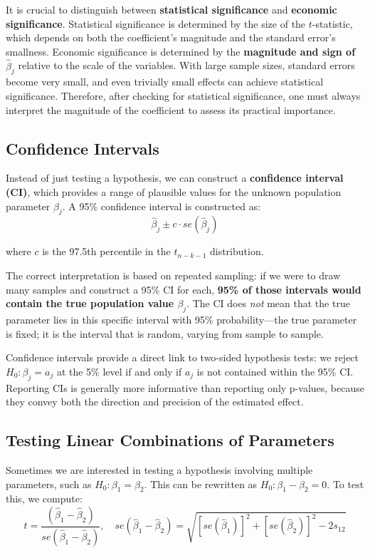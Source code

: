 It is crucial to distinguish between \textbf{statistical significance} and \textbf{economic significance}. Statistical significance is determined by the size of the $t$-statistic, which depends on both the coefficient's magnitude and the standard error's smallness. Economic significance is determined by the \textbf{magnitude and sign of $\hat{\beta}_j$} relative to the scale of the variables. With large sample sizes, standard errors become very small, and even trivially small effects can achieve statistical significance. Therefore, after checking for statistical significance, one must always interpret the magnitude of the coefficient to assess its practical importance.
\subsection{Confidence Intervals}

Instead of just testing a hypothesis, we can construct a \textbf{confidence interval (CI)}, which provides a range of plausible values for the unknown population parameter $\beta_j$. A 95\% confidence interval is constructed as:
$$\hat{\beta}_j \pm c \cdot se(\hat{\beta}_j)$$

where $c$ is the 97.5th percentile in the $t_{n-k-1}$ distribution.

The correct interpretation is based on repeated sampling: if we were to draw many samples and construct a 95\% CI for each, \textbf{95\% of those intervals would contain the true population value $\beta_j$}. The CI does \emph{not} mean that the true parameter lies in this specific interval with 95\% probability---the true parameter is fixed; it is the interval that is random, varying from sample to sample.

Confidence intervals provide a direct link to two-sided hypothesis tests: we reject $H_0: \beta_j = a_j$ at the 5\% level if and only if $a_j$ is not contained within the 95\% CI. Reporting CIs is generally more informative than reporting only p-values, because they convey both the direction and precision of the estimated effect.
\subsection{Testing Linear Combinations of Parameters}

Sometimes we are interested in testing a hypothesis involving multiple parameters, such as $H_0: \beta_1 = \beta_2$. This can be rewritten as $H_0: \beta_1 - \beta_2 = 0$. To test this, we compute:
$$t = \frac{(\hat{\beta}_1 - \hat{\beta}_2)}{se(\hat{\beta}_1 - \hat{\beta}_2)}, \quad se(\hat{\beta}_1 - \hat{\beta}_2) = \sqrt{[se(\hat{\beta}_1)]^2 + [se(\hat{\beta}_2)]^2 - 2s_{12}}$$

